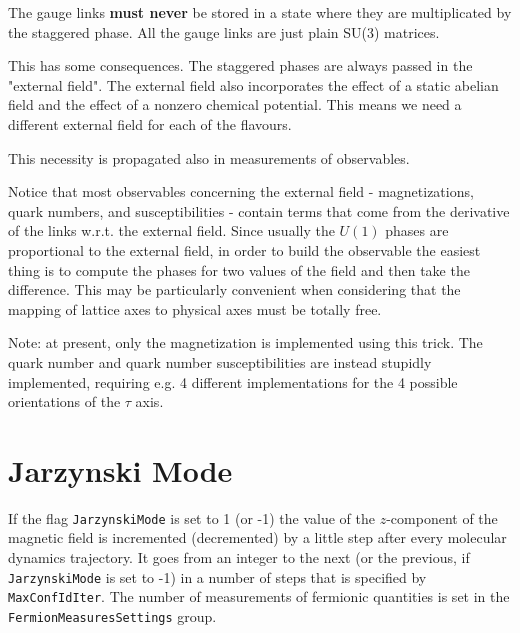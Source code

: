 The gauge links {\bf must never} be stored in a state where they
are multiplicated by the staggered phase. All the gauge links are just
plain SU(3) matrices.

This has some consequences. The staggered phases are always passed in the "external field".
The external field also incorporates the effect of a static abelian
field and the effect of a nonzero chemical potential.
This means we need a different external field for each of the
flavours.

This necessity is propagated also in measurements of observables.

Notice that most observables concerning the external field - magnetizations, 
quark numbers, and susceptibilities - contain terms that come from the derivative 
of the links w.r.t. the external field. Since usually the $U(1)$ phases are proportional 
to the external field, in order to build the observable the easiest thing is to 
compute the phases for two values of the field and then take the difference.
This may be particularly convenient when considering that the mapping of lattice axes to physical axes 
must be totally free.

Note: at present, only the magnetization is implemented using this trick. The 
quark number and quark number susceptibilities are instead stupidly implemented, requiring e.g. 4 different 
implementations for the 4 possible orientations of the $\tau$ axis.

\section{Jarzynski Mode}
\label{JarzynskiMode}

If the flag \verb|JarzynskiMode| is set to 1 (or -1) the value of the $z$-component of the magnetic field is incremented (decremented)
by a little step after every molecular dynamics trajectory. It goes from an integer to the next (or the previous, if \verb|JarzynskiMode| is set to -1)
in a number of steps that is specified by \verb|MaxConfIdIter|. 
The number of measurements of fermionic quantities is set in the \verb|FermionMeasuresSettings| group.


